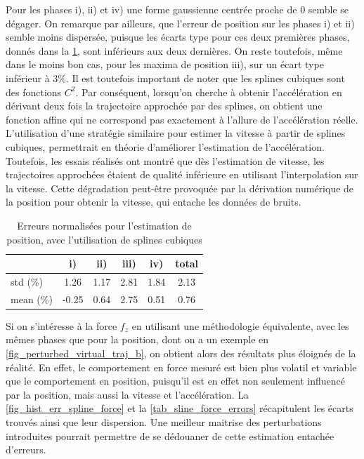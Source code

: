 \documentclass[12pt, a4paper]{article} %
\numberwithin{equation}{section}
\begin{document}
Pour les phases i), ii) et iv) une forme gaussienne centrée proche de 0 semble se dégager. On remarque par ailleurs, que l'erreur de position sur les phases i) et ii) semble moins dispersée, puisque les écarts type pour ces deux premières phases, donnés dans la \cref{tab_sline_position_errors}, sont inférieurs aux deux dernières. On reste toutefois, même dans le moins bon cas, pour les maxima de position iii), sur un écart type inférieur à 3\%.
%
\newlineBlank
%
Il est toutefois important de noter que les splines cubiques sont des fonctions $ C^2 $. Par conséquent, lorsqu'on cherche à obtenir l'accélération en dérivant deux fois la trajectoire approchée par des splines, on obtient une fonction affine qui ne correspond pas exactement à l'allure de l'accélération réelle. L'utilisation d'une stratégie similaire pour estimer la vitesse à partir de splines cubiques, permettrait en théorie d'améliorer l'estimation de l'accélération. Toutefois, les essais réalisés ont montré que dès l'estimation de vitesse, les trajectoires approchées étaient de qualité inférieure en utilisant l'interpolation sur la vitesse. Cette dégradation peut-être provoquée par la dérivation numérique de la position pour obtenir la vitesse, qui entache les données de bruits. 
%
\begin{table}[]
	\centering
	\begin{tabular}{l|c c c c|c }
		\multicolumn{1}{c|}{} & i)   & ii)  & iii) & iv) & total \\
		\hline
		std (\%)             & 1.26 & 1.17 & 2.81 & 1.84 & 2.13  \\
		mean (\%)            &-0.25 & 0.64 & 2.75 & 0.51 & 0.76  \\
	\end{tabular}
	\caption{Erreurs normalisées pour l'estimation de position, avec l'utilisation de splines cubiques}
	\label{tab_sline_position_errors}
\end{table}
%
\newlineBlank
%
Si on s'intéresse à la force $ f_z $ en utilisant une méthodologie équivalente, avec les mêmes phases que pour la position, dont on a un exemple en \cref{fig_perturbed_virtual_traj_b}, on obtient alors des résultats plus éloignés de la réalité. En effet, le comportement en force mesuré est bien plus volatil et variable que le comportement en position, puisqu'il est en effet non seulement influencé par la position, mais aussi la vitesse et l'accélération. La \cref{fig_hist_err_spline_force} et la \cref{tab_sline_force_errors} récapitulent les écarts trouvés ainsi que leur dispersion. Une meilleur maitrise des perturbations introduites pourrait permettre de se dédouaner de cette estimation entachée d'erreurs.
\end{document}
